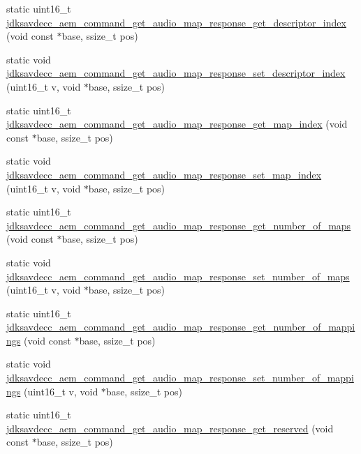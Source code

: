 \begin{DoxyCompactItemize}
\item 
static uint16\+\_\+t \hyperlink{group__command__get__audio__map__response_ga59110138100c2d8b54c2bb035604d6a2}{jdksavdecc\+\_\+aem\+\_\+command\+\_\+get\+\_\+audio\+\_\+map\+\_\+response\+\_\+get\+\_\+descriptor\+\_\+index} (void const $\ast$base, ssize\+\_\+t pos)
\item 
static void \hyperlink{group__command__get__audio__map__response_ga1d842d4b41d740f9731bbfcb5ebf28ad}{jdksavdecc\+\_\+aem\+\_\+command\+\_\+get\+\_\+audio\+\_\+map\+\_\+response\+\_\+set\+\_\+descriptor\+\_\+index} (uint16\+\_\+t v, void $\ast$base, ssize\+\_\+t pos)
\item 
static uint16\+\_\+t \hyperlink{group__command__get__audio__map__response_ga64da102f201b88cea6fea5c801a1d8e5}{jdksavdecc\+\_\+aem\+\_\+command\+\_\+get\+\_\+audio\+\_\+map\+\_\+response\+\_\+get\+\_\+map\+\_\+index} (void const $\ast$base, ssize\+\_\+t pos)
\item 
static void \hyperlink{group__command__get__audio__map__response_gacccefe08f17889479b4c1d0b30994731}{jdksavdecc\+\_\+aem\+\_\+command\+\_\+get\+\_\+audio\+\_\+map\+\_\+response\+\_\+set\+\_\+map\+\_\+index} (uint16\+\_\+t v, void $\ast$base, ssize\+\_\+t pos)
\item 
static uint16\+\_\+t \hyperlink{group__command__get__audio__map__response_ga1ef895c698c0a8cee1eae241f9433af1}{jdksavdecc\+\_\+aem\+\_\+command\+\_\+get\+\_\+audio\+\_\+map\+\_\+response\+\_\+get\+\_\+number\+\_\+of\+\_\+maps} (void const $\ast$base, ssize\+\_\+t pos)
\item 
static void \hyperlink{group__command__get__audio__map__response_ga2e0775aa5be20bc2462824d3cda6c5b2}{jdksavdecc\+\_\+aem\+\_\+command\+\_\+get\+\_\+audio\+\_\+map\+\_\+response\+\_\+set\+\_\+number\+\_\+of\+\_\+maps} (uint16\+\_\+t v, void $\ast$base, ssize\+\_\+t pos)
\item 
static uint16\+\_\+t \hyperlink{group__command__get__audio__map__response_gad2cadbf9180c687c17781f6038a0fe3b}{jdksavdecc\+\_\+aem\+\_\+command\+\_\+get\+\_\+audio\+\_\+map\+\_\+response\+\_\+get\+\_\+number\+\_\+of\+\_\+mappings} (void const $\ast$base, ssize\+\_\+t pos)
\item 
static void \hyperlink{group__command__get__audio__map__response_ga96d45c9d69a27835cc345fafc36b0098}{jdksavdecc\+\_\+aem\+\_\+command\+\_\+get\+\_\+audio\+\_\+map\+\_\+response\+\_\+set\+\_\+number\+\_\+of\+\_\+mappings} (uint16\+\_\+t v, void $\ast$base, ssize\+\_\+t pos)
\item 
static uint16\+\_\+t \hyperlink{group__command__get__audio__map__response_ga387349ea4995bb254eb007ca1092cc08}{jdksavdecc\+\_\+aem\+\_\+command\+\_\+get\+\_\+audio\+\_\+map\+\_\+response\+\_\+get\+\_\+reserved} (void const $\ast$base, ssize\+\_\+t pos)

\end{DoxyCompactItemize}
